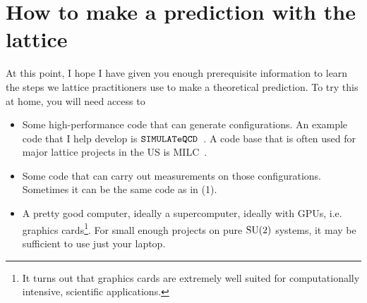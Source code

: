 



\section{How to make a prediction with the lattice}\label{sec:steps}

At this point, I hope I have given you enough prerequisite information to learn
the steps we lattice practitioners use to make a theoretical prediction. To try
this at home, you will need access to
\begin{itemize}
  \item Some high-performance code that can generate configurations. An example
code that I help develop is $\texttt{SIMULATeQCD}$~\cite{github,Bollweg:2021cvl}.
A code base that is often used for major lattice projects in the US
is MILC~\cite{MILC}.
  \item Some code that can carry out measurements on those configurations.
Sometimes it can be the same code as in (1).
  \item A pretty good computer, ideally a supercomputer, ideally with GPUs, i.e.
graphics cards\footnote{It turns out that graphics cards are extremely well
suited for computationally intensive, scientific applications.}. For small
enough projects on pure $\operatorname{SU}(2)$ systems, it may be sufficient to use just your
laptop.
\end{itemize}

